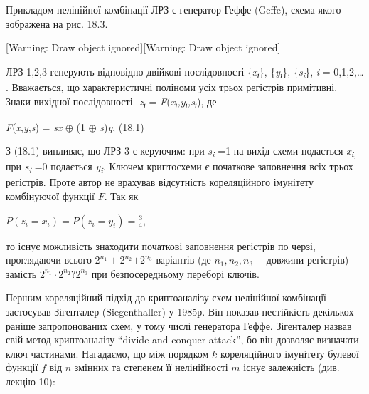 Прикладом нелінійної комбінації ЛРЗ є генератор Геффе (Geffe), схема якого
зображена на рис. 18.3. 


\bigskip

[Warning: Draw object ignored][Warning: Draw object ignored]

ЛРЗ 1,2,3 генерують відповідно двійкові послідовності
\{\textit{x}\textit{\textsubscript{і}}\},
\{\textit{y}\textit{\textsubscript{і}}\},
\{\textit{s}\textit{\textsubscript{i}}\},  \textit{i} = 0,1,2,… . Вважається,
що характеристичні поліноми усіх трьох регістрів примітивні. Знаки вихідної
послідовності   $ $ \textit{z}\textit{\textsubscript{і}} =
\textit{F}(\textit{x}\textit{\textsubscript{і}}\textit{,}\textit{y}\textit{\textsubscript{і}}\textit{,}\textit{s}\textit{\textsubscript{і}}),
де


\bigskip

{\centering
\textit{ }\textit{F}(\textit{x},\textit{y},\textit{s}) = \textit{sx} $\oplus$
(1 $\oplus$  \textit{s})\textit{y},  (18.1)
\par}


\bigskip

З (18.1) випливає, що ЛРЗ 3 є керуючим:  при
\textit{s}\textit{\textsubscript{i}} =1  на вихід схеми подається 
\textit{x}\textit{\textsubscript{i}}\textsubscript{,  }при 
\textit{s}\textit{\textsubscript{i}}\textsubscript{ }=0  подається\textit{
}\textit{y}\textit{\textsubscript{i}}. Ключем криптосхеми є початкове
заповнення всіх трьох регістрів. Проте автор не врахував відсутність
кореляційного імунітету комбінуючої функції  $F$. Так як 

{\centering
 $P(z_{i}=x_{i})=P(z_{i}=y_{i})=\frac{3}4$,
\par}

то існує можливість знаходити початкові заповнення регістрів по черзі,
проглядаючи всього  $2^{n_{{1}}}+2^{n_{2}}{+2^{n_3}}$ варіантів (де 
$n_{1},n_{2},n_3$--- довжини регістрів) замість  ${2^{n_{{1}}}\cdot
2^{n_{2}}{?2^{n_{3}}}}$ при безпосередньому переборі ключів.

Першим кореляційний підхід до криптоаналізу схем нелінійної комбінації
застосував Зігенталер (Siegenthaller) у 1985р. Він показав нестійкість
декількох раніше запропонованих схем, у тому числі генератора Геффе. Зігенталер
назвав свій метод криптоаналізу “divide{}-and{}-conquer attack”, бо він
дозволяє визначати ключ частинами. Нагадаємо, що між порядком  $k$
кореляційного імунітету булевої функції  $f$ від  $n$ змінних та степенем
її нелінійності  $m$ існує залежність (див. лекцію 10): 


